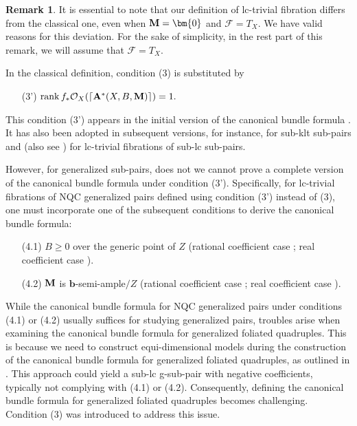\documentclass[11pt]{amsart}
\numberwithin{equation}{section}
\newcommand{\bb}{\bm{b}}
\newcommand{\Mm}{{\bf{M}}}
\newcommand{\rk}{\operatorname{rank}}
\newcommand{\Aa}{{\bf{A}}}
\newcommand{\Ff}{\mathcal{F}}
\theoremstyle{definition}
\theoremstyle{definition}
\newtheorem{rem}[thm]{Remark}
\theoremstyle{definition}
\begin{document}
\begin{rem}\label{rem: lc trivial fibration definition}
It is essential to note that our definition of lc-trivial fibration differs from the classical one, even when $\Mm=\bm{0}$ and $\Ff=T_X$. We have valid reasons for this deviation. For the sake of simplicity, in the rest part of this remark, we will assume that $\Ff=T_X$.
    
In the classical definition, condition (3) is substituted by
\begin{enumerate}
        \item[(3')] $\rk f_*\mathcal{O}_X(\lceil\Aa^*(X,B,\Mm)\rceil)=1.$
\end{enumerate} 
This condition (3') appears in the initial version of the canonical bundle formula \cite[Condition (3) of Theorem 2]{Kaw98}. It has also been adopted in subsequent versions, for instance, \cite[Theorem 0.2]{Amb05} for sub-klt sub-pairs and \cite[Theorem 8.3.7]{Kol07} (also see \cite[Theorem 3.6]{FG14}) for lc-trivial fibrations of sub-lc sub-pairs.

However, for generalized sub-pairs, does not we cannot prove a complete version of the canonical bundle formula under condition (3'). Specifically, for lc-trivial fibrations of NQC generalized pairs defined using condition (3') instead of (3), one must incorporate one of the subsequent conditions to derive the canonical bundle formula:
\begin{itemize}
        \item[(4.1)] $B\geq 0$ over the generic point of $Z$ (rational coefficient case \cite[Theorem 2.20]{FS23}; real coefficient case \cite[Theorem 2.23]{JLX22}).
        \item[(4.2)] $\Mm$ is $\bb$-semi-ample$/Z$ (rational coefficient case \cite[Chapter 6, Theorem 7]{Fil19}; real coefficient case \cite[Theorem 2.23]{JLX22}).
\end{itemize}
While the canonical bundle formula for NQC generalized pairs under conditions (4.1) or (4.2) usually suffices for studying generalized pairs, troubles arise when examining the canonical bundle formula for generalized foliated quadruples. This is because we need to construct equi-dimensional models during the construction of the canonical bundle formula for generalized foliated quadruples, as outlined in \cite[Definition-Theorem 6.12]{LLM23}. This approach could yield a sub-lc g-sub-pair with negative coefficients, typically not complying with (4.1) or (4.2). Consequently, defining the canonical bundle formula for generalized foliated quadruples becomes challenging. Condition (3) was introduced to address this issue.


\end{rem}
\end{document}

